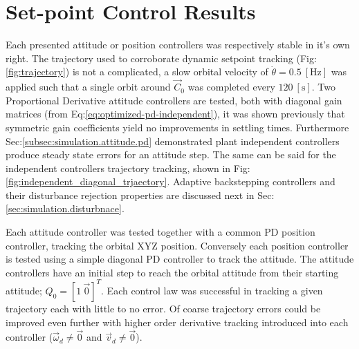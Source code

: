 \section{Set-point Control Results}
\label{sec:simulation.autopilot}
Each presented attitude or position controllers was respectively stable in it's own right. The trajectory used to corroborate dynamic setpoint tracking (Fig:\ref{fig:trajectory}) is not a complicated, a slow orbital velocity of $\dot{\theta}=0.5~[\text{Hz}]$ was applied such that a single orbit around $\vec{C}_0$ was completed every $120~[\text{s}]$. Two Proportional Derivative attitude controllers are tested, both with diagonal gain matrices (from Eq:\ref{eq:optimized-pd-independent}), it was shown previously that symmetric gain coefficients yield no improvements in settling times. Furthermore Sec:\ref{subsec:simulation.attitude.pd} demonstrated plant independent controllers produce steady state errors for an attitude step. The same can be said for the independent controllers trajectory tracking, shown in Fig:\ref{fig:independent_diagonal_trjaectory}. Adaptive backstepping controllers and their disturbance rejection properties are discussed next in Sec:\ref{sec:simulation.disturbnace}. 
\par
Each attitude controller was tested together with a common PD position controller, tracking the orbital XYZ position. Conversely each position controller is tested using a simple diagonal PD controller to track the attitude. The attitude controllers have an initial step to reach the orbital attitude from their starting attitude; $Q_0=[1~\vec{0}]^T$. Each control law was successful in tracking a given trajectory each with little to no error. Of coarse trajectory errors could be improved even further with higher order derivative tracking introduced into each controller ($\vec{\omega}_d\not=\vec{0}$ and $\vec{v}_d\not=\vec{0}$).
